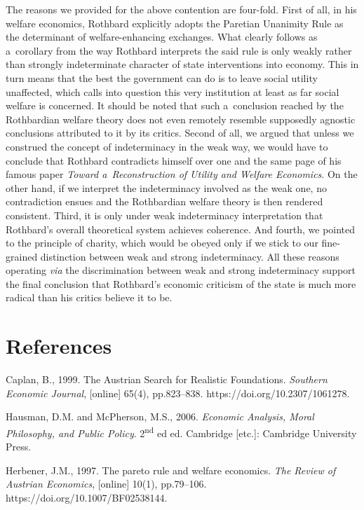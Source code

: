 The reasons we provided for the above contention are four-fold. First of all, in his welfare economics, Rothbard explicitly adopts the Paretian Unanimity Rule as the determinant of welfare-enhancing exchanges. What clearly follows as a~corollary from the way Rothbard interprets the said rule is only weakly rather than strongly indeterminate character of state interventions into economy. This in turn means that the best the government can do is to leave social utility unaffected, which calls into question this very institution at least as far social welfare is concerned. It should be noted that such a~conclusion reached by the Rothbardian welfare theory does not even remotely resemble supposedly agnostic conclusions attributed to it by its critics. Second of all, we argued that unless we construed the concept of indeterminacy in the weak way, we would have to conclude that Rothbard contradicts himself over one and the same page of his famous paper \textit{Toward a~Reconstruction of Utility and Welfare Economics}. On the other hand, if we interpret the indeterminacy involved as the weak one, no contradiction ensues and the Rothbardian welfare theory is then rendered consistent. Third, it is only under weak indeterminacy interpretation that Rothbard's overall theoretical system achieves coherence. And fourth, we pointed to the principle of charity, which would be obeyed only if we stick to our fine-grained distinction between weak and strong indeterminacy. All these reasons operating \textit{via} the discrimination between weak and strong indeterminacy support the final conclusion that Rothbard's economic criticism of the state is much more radical than his critics believe it to be.



\section{References}

Caplan, B., 1999. The Austrian Search for Realistic Foundations. \textit{Southern Economic Journal}, [online] 65(4), pp.823–838. https://doi.org/10.2307/1061278.



Hausman, D.M. and McPherson, M.S., 2006. \textit{Economic Analysis, Moral Philosophy, and Public Policy}. 2\textsuperscript{nd} ed ed. Cambridge [etc.]: Cambridge University Press.



Herbener, J.M., 1997. The pareto rule and welfare economics. \textit{The Review of Austrian Economics}, [online] 10(1), pp.79–106. https://doi.org/10.1007/BF02538144.



